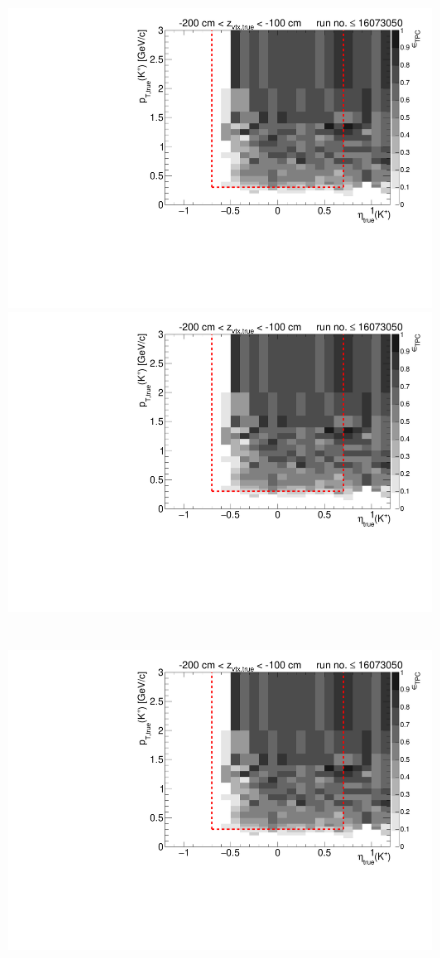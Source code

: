 \begin{figure}[hb]
{  \includegraphics[width=\linewidth,page=7]{graphics/eff/Eff2D_TPC_kaon_Plus_RunRange1.pdf}\\
  \includegraphics[width=\linewidth,page=9]{graphics/eff/Eff2D_TPC_kaon_Plus_RunRange1.pdf}
}~
\parbox{0.495\textwidth}{
  \centering
  \includegraphics[width=\linewidth,page=4]{graphics/eff/Eff2D_TPC_kaon_Plus_RunRange1.pdf}\\
}
\end{figure}
